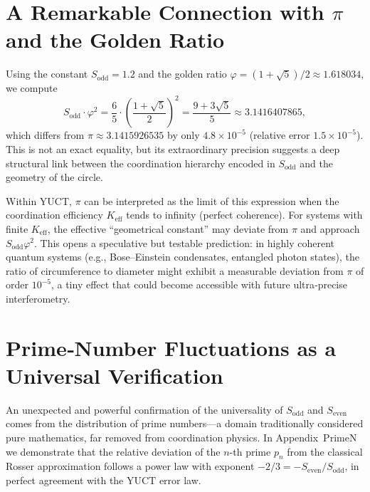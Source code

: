 \documentclass[12pt,a4paper]{article}
\begin{document}
	\section{A Remarkable Connection with \(\pi\) and the Golden Ratio}
	\label{sec:pi_relation}
	
	Using the constant \(S_{\text{odd}} = 1.2\) and the golden ratio \(\varphi = (1+\sqrt{5})/2 \approx 1.618034\), we compute
	\[
	S_{\text{odd}} \cdot \varphi^2 = \frac{6}{5} \cdot \left(\frac{1+\sqrt{5}}{2}\right)^2 = \frac{9+3\sqrt{5}}{5} \approx 3.1416407865,
	\]
	which differs from \(\pi \approx 3.1415926535\) by only \(4.8\times10^{-5}\) (relative error \(1.5\times10^{-5}\)). This is not an exact equality, but its extraordinary precision suggests a deep structural link between the coordination hierarchy encoded in \(S_{\text{odd}}\) and the geometry of the circle.
	
	Within YUCT, \(\pi\) can be interpreted as the limit of this expression when the coordination efficiency \(K_{\text{eff}}\) tends to infinity (perfect coherence). For systems with finite \(K_{\text{eff}}\), the effective “geometrical constant” may deviate from \(\pi\) and approach \(S_{\text{odd}}\varphi^2\). This opens a speculative but testable prediction: in highly coherent quantum systems (e.g., Bose–Einstein condensates, entangled photon states), the ratio of circumference to diameter might exhibit a measurable deviation from \(\pi\) of order \(10^{-5}\), a tiny effect that could become accessible with future ultra‑precise interferometry.
	
	\section{Prime‑Number Fluctuations as a Universal Verification}
	\label{sec:primes}
	
	An unexpected and powerful confirmation of the universality of \(S_{\mathrm{odd}}\) and \(S_{\mathrm{even}}\) comes from the distribution of prime numbers—a domain traditionally considered pure mathematics, far removed from coordination physics.  In Appendix~PrimeN we demonstrate that the relative deviation of the \(n\)-th prime \(p_n\) from the classical Rosser approximation follows a power law with exponent \(-2/3 = -S_{\mathrm{even}}/S_{\mathrm{odd}}\), in perfect agreement with the YUCT error law.
	
\end{document}
